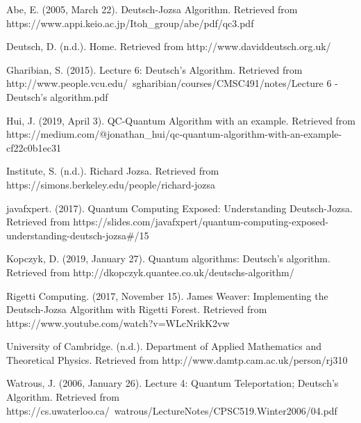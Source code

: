 \documentclass[12pt]{article}
\theoremstyle{definition}
\begin{document}
\begin{thebibliography}{9}
\bibitem{}
Abe, E. (2005, March 22). Deutsch-Jozsa Algorithm. Retrieved from https://www.appi.keio.ac.jp/Itoh\_group/abe/pdf/qc3.pdf

\bibitem{}
Deutsch, D. (n.d.). Home. Retrieved from http://www.daviddeutsch.org.uk/

\bibitem{}
Gharibian, S. (2015). Lecture 6: Deutsch’s Algorithm. Retrieved from http://www.people.vcu.edu/~sgharibian/courses/CMSC491/notes/Lecture 6 - Deutsch's algorithm.pdf

\bibitem{}
Hui, J. (2019, April 3). QC-Quantum Algorithm with an example. Retrieved from https://medium.com/@jonathan\_hui/qc-quantum-algorithm-with-an-example-cf22c0b1ec31

\bibitem{}
Institute, S. (n.d.). Richard Jozsa. Retrieved from https://simons.berkeley.edu/people/richard-jozsa

\bibitem{}
javafxpert. (2017). Quantum Computing Exposed: Understanding Deutsch-Jozsa. Retrieved from https://slides.com/javafxpert/quantum-computing-exposed-understanding-deutsch-jozsa#/15

\bibitem{}
Kopczyk, D. (2019, January 27). Quantum algorithms: Deutsch's algorithm. Retrieved from http://dkopczyk.quantee.co.uk/deutschs-algorithm/

\bibitem{} 
Rigetti Computing. (2017, November 15). James Weaver: Implementing the Deutsch-Jozsa Algorithm with Rigetti Forest. Retrieved from https://www.youtube.com/watch?v=WLcNrikK2vw

\bibitem{}
University of Cambridge. (n.d.). Department of Applied Mathematics and Theoretical Physics. Retrieved from http://www.damtp.cam.ac.uk/person/rj310

\bibitem{} 
Watrous, J. (2006, January 26). Lecture 4: Quantum Teleportation; Deutsch’s Algorithm. Retrieved from https://cs.uwaterloo.ca/~watrous/LectureNotes/CPSC519.Winter2006/04.pdf

\end{thebibliography}
\end{document}
